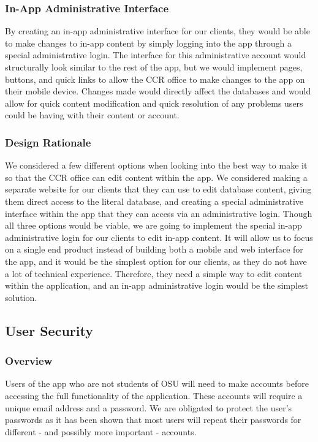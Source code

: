 \documentclass[draftclsnofoot, onecolumn, 10pt, compsoc]{IEEEtran}
\begin{document}
			\subsubsection{In-App Administrative Interface}
				By creating an in-app administrative interface for our clients, they would be able to make changes to in-app content by simply logging into the app through a special administrative login. The interface for this administrative account would structurally look similar to the rest of the app, but we would implement pages, buttons, and quick links to allow the CCR office to make changes to the app on their mobile device. Changes made would directly affect the databases and would allow for quick content modification and quick resolution of any problems users could be having with their content or account.
			\subsubsection{Design Rationale}
				We considered a few different options when looking into the best way to make it so that the CCR office can edit content within the app. We considered making a separate website for our clients that they can use to edit database content, giving them direct access to the literal database, and creating a special administrative interface within the app that they can access via an administrative login. Though all three options would be viable, we are going to implement the special in-app administrative login for our clients to edit in-app content. It will allow us to focus on a single end product instead of building both a mobile and web interface for the app, and it would be the simplest option for our clients, as they do not have a lot of technical experience. Therefore, they need a simple way to edit content within the application, and an in-app administrative login would be the simplest solution.

		\subsection{User Security}
			\subsubsection{Overview}
				Users of the app who are not students of OSU will need to make accounts before accessing the full functionality of the application. These accounts will require a unique email address and a password. We are obligated to protect the user's passwords as it has been shown that most users will repeat their passwords for different - and possibly more important - accounts.
\end{document}
